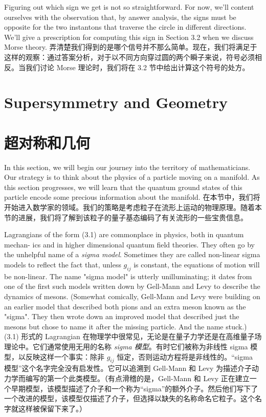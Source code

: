 \documentclass{article}
\begin{document}
\begin{paracol}{2}
Figuring out which sign we get is not so straightforward. For now, we’ll content ourselves with the observation that, by answer analysis, the signs must be opposite for the two instantons that traverse the circle in different directions. We’ll give a prescription for computing this sign in Section 3.2 when we discuss Morse theory.
\switchcolumn
弄清楚我们得到的是哪个信号并不那么简单。现在，我们将满足于这样的观察：通过答案分析，对于以不同方向穿过圆的两个瞬子来说，符号必须相反。当我们讨论 Morse 理论时，我们将在 3.2 节中给出计算这个符号的处方。
\switchcolumn*

\section{Supersymmetry and Geometry}
\switchcolumn
\section*{超对称和几何}
\switchcolumn*

In this section, we will begin our journey into the territory of mathematicians. Our strategy is to think about the physics of a particle moving on a manifold. As this section progresses, we will learn that the quantum ground states of this particle encode some precious information about the manifold.
\switchcolumn
在本节中，我们将开始进入数学家的领域。我们的策略是考虑粒子在流形上运动的物理原理。随着本节的进展，我们将了解到该粒子的量子基态编码了有关流形的一些宝贵信息。
\switchcolumn*

Lagrangians of the form (3.1) are commonplace in physics, both in quantum mechan- ics and in higher dimensional quantum field theories. They often go by the unhelpful name of a \textit{sigma model}. Sometimes they are called non-linear sigma models to reﬂect the fact that, unless $g_{ij}$ is constant, the equations of motion will be non-linear. The name "sigma model" is utterly unilluminating; it dates from one of the first such models written down by Gell-Mann and Levy to describe the dynamics of mesons. (Somewhat comically, Gell-Mann and Levy were building on an earlier model that described both pions and an extra meson known as the "sigma". They then wrote down an improved model that described just the mesons but chose to name it after the missing particle. And the name stuck.)
\switchcolumn
(3.1) 形式的 Lagrangian 在物理学中很常见，无论是在量子力学还是在高维量子场理论中。它们通常使用无用的名称 \textit{sigma 模型}。有时它们被称为非线性 sigma 模型，以反映这样一个事实：除非 $g_{ij}$ 恒定，否则运动方程将是非线性的。“sigma 模型”这个名字完全没有启发性。它可以追溯到 Gell-Mann 和 Levy 为描述介子动力学而编写的第一个此类模型。（有点滑稽的是，Gell-Mann 和 Levy 正在建立一个早期模型，该模型描述了介子和一个称为“sigma”的额外介子。然后他们写下了一个改进的模型，该模型仅描述了介子，但选择以缺失的名称命名它粒子。这个名字就这样被保留下来了。）
\switchcolumn*


\end{paracol}
\end{document}
